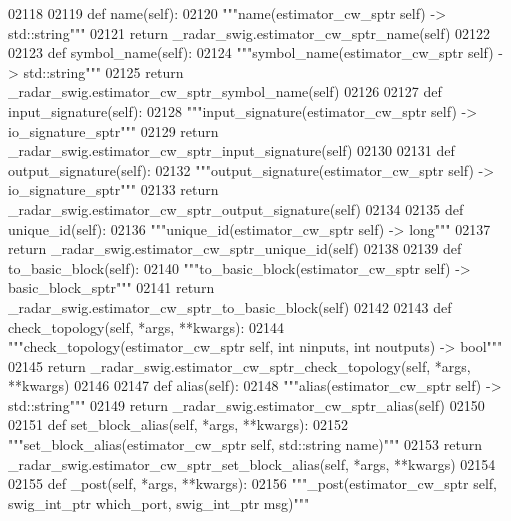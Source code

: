 \begin{DoxyCode}
{{{{{{{{02118 
02119     \textcolor{keyword}{def }name(self):
02120         \textcolor{stringliteral}{"""name(estimator\_cw\_sptr self) -> std::string"""}
02121         \textcolor{keywordflow}{return} \_radar\_swig.estimator\_cw\_sptr\_name(self)
02122 
02123     \textcolor{keyword}{def }symbol_name(self):
02124         \textcolor{stringliteral}{"""symbol\_name(estimator\_cw\_sptr self) -> std::string"""}
02125         \textcolor{keywordflow}{return} \_radar\_swig.estimator\_cw\_sptr\_symbol\_name(self)
02126 
02127     \textcolor{keyword}{def }input_signature(self):
02128         \textcolor{stringliteral}{"""input\_signature(estimator\_cw\_sptr self) -> io\_signature\_sptr"""}
02129         \textcolor{keywordflow}{return} \_radar\_swig.estimator\_cw\_sptr\_input\_signature(self)
02130 
02131     \textcolor{keyword}{def }output_signature(self):
02132         \textcolor{stringliteral}{"""output\_signature(estimator\_cw\_sptr self) -> io\_signature\_sptr"""}
02133         \textcolor{keywordflow}{return} \_radar\_swig.estimator\_cw\_sptr\_output\_signature(self)
02134 
02135     \textcolor{keyword}{def }unique_id(self):
02136         \textcolor{stringliteral}{"""unique\_id(estimator\_cw\_sptr self) -> long"""}
02137         \textcolor{keywordflow}{return} \_radar\_swig.estimator\_cw\_sptr\_unique\_id(self)
02138 
02139     \textcolor{keyword}{def }to_basic_block(self):
02140         \textcolor{stringliteral}{"""to\_basic\_block(estimator\_cw\_sptr self) -> basic\_block\_sptr"""}
02141         \textcolor{keywordflow}{return} \_radar\_swig.estimator\_cw\_sptr\_to\_basic\_block(self)
02142 
02143     \textcolor{keyword}{def }check_topology(self, *args, **kwargs):
02144         \textcolor{stringliteral}{"""check\_topology(estimator\_cw\_sptr self, int ninputs, int noutputs) -> bool"""}
02145         \textcolor{keywordflow}{return} \_radar\_swig.estimator\_cw\_sptr\_check\_topology(self, *args, **kwargs)
02146 
02147     \textcolor{keyword}{def }alias(self):
02148         \textcolor{stringliteral}{"""alias(estimator\_cw\_sptr self) -> std::string"""}
02149         \textcolor{keywordflow}{return} \_radar\_swig.estimator\_cw\_sptr\_alias(self)
02150 
02151     \textcolor{keyword}{def }set_block_alias(self, *args, **kwargs):
02152         \textcolor{stringliteral}{"""set\_block\_alias(estimator\_cw\_sptr self, std::string name)"""}
02153         \textcolor{keywordflow}{return} \_radar\_swig.estimator\_cw\_sptr\_set\_block\_alias(self, *args, **kwargs)
02154 
02155     \textcolor{keyword}{def }_post(self, *args, **kwargs):
02156         \textcolor{stringliteral}{"""\_post(estimator\_cw\_sptr self, swig\_int\_ptr which\_port, swig\_int\_ptr msg)"""}
}}}}}}}}
\end{DoxyCode}
